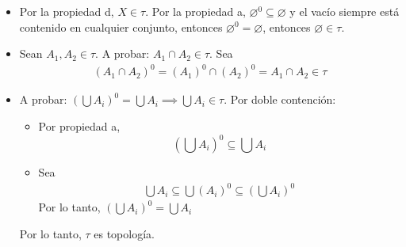 \begin{problema}
\begin{enumerate}
\begin{dem}
            \begin{itemize}
                \item Por la propiedad d, $X\in \tau$. Por la propiedad a, $\varnothing^0\subseteq\varnothing$ y el vacío siempre está contenido en cualquier conjunto, entonces $\varnothing^0=\varnothing$, entonces $\varnothing\in \tau$.
                \item Sean $A_1,A_2\in \tau$. A probar: $A_1\cap A_2 \in \tau $. Sea
                \begin{align*}
                    (A_1\cap A_2)^0 = (A_1)^0\cap (A_2)^0 = A_1\cap A_2\in \tau
                \end{align*}
                
                \item A probar: $\left(\bigcup A_i\right)^0 = \bigcup A_i\implies\bigcup A_i\in \tau $. Por doble contención: 
                \begin{itemize}
                    \item Por propiedad a, 
                    $$\left(\bigcup A_i\right)^0 \subseteq \bigcup A_i$$
                    \item Sea 
                    \begin{align*}
                        \bigcup A_i\subseteq \bigcup (A_i)^0\subseteq \left(\bigcup A_i\right)^0 
                    \end{align*}
                    Por lo tanto, $\left(\bigcup A_i\right)^0 = \bigcup A_i$
                \end{itemize}
                Por lo tanto, $\tau$ es topología. 
            \end{itemize}
        \end{dem}
    \end{enumerate}


\end{problema}

